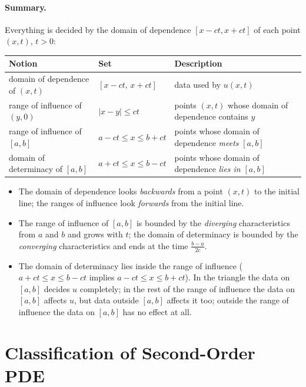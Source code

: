 \documentclass[11pt]{article}
\theoremstyle{plain}
\theoremstyle{definition}
\theoremstyle{remark}
\begin{document}
\paragraph{Summary.} Everything is decided by the domain of dependence $[x - ct, x + ct]$ of each point $(x,t)$, $t > 0$:
\begin{center}
\renewcommand{\arraystretch}{1.4}
\begin{tabular}{|p{4.6cm}|p{3.4cm}|p{6cm}|}
\hline
\textbf{Notion} & \textbf{Set} & \textbf{Description} \\ \hline
domain of dependence of $(x,t)$ & $[x - ct,\, x + ct]$ & data used by $u(x,t)$ \\ \hline
range of influence of $(y,0)$ & $|x - y| \leq ct$ & points $(x,t)$ whose domain of dependence contains $y$ \\ \hline
range of influence of $[a,b]$ & $a - ct \leq x \leq b + ct$ & points whose domain of dependence \emph{meets} $[a,b]$ \\ \hline
domain of determinacy of $[a,b]$ & $a + ct \leq x \leq b - ct$ & points whose domain of dependence \emph{lies in} $[a,b]$ \\ \hline
\end{tabular}
\end{center}
\begin{itemize}
    \item The domain of dependence looks \emph{backwards} from a point $(x,t)$ to the initial line; the ranges of influence look \emph{forwards} from the initial line.
    \item The range of influence of $[a,b]$ is bounded by the \emph{diverging} characteristics from $a$ and $b$ and grows with $t$; the domain of determinacy is bounded by the \emph{converging} characteristics and ends at the time $\frac{b-a}{2c}$.
    \item The domain of determinacy lies inside the range of influence ($a + ct \le x \le b - ct$ implies $a - ct \leq x \leq b + ct$). In the triangle the data on $[a,b]$ decides $u$ completely; in the rest of the range of influence the data on $[a,b]$ affects $u$, but data outside $[a,b]$ affects it too; outside the range of influence the data on $[a,b]$ has no effect at all.
\end{itemize}

\newpage
\section{Classification of Second-Order PDE}\label{sec:classify}
\end{document}
